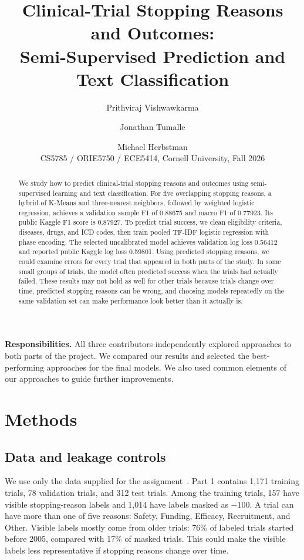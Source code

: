 \documentclass[10pt,twocolumn,letterpaper]{article}
\title{Clinical-Trial Stopping Reasons and Outcomes:\\Semi-Supervised Prediction and Text Classification}
\author{Prithviraj Vishwawkarma \and Jonathan Tumalle \and Michael Herbstman\\
CS5785 / ORIE5750 / ECE5414, Cornell University, Fall 2026}
\begin{document}
\maketitle
\noindent\textbf{Responsibilities.} All three contributors independently explored approaches
to both parts of the project. We compared our results and selected the best-performing
approaches for the final models. We also used common elements of our approaches to
guide further improvements.

\begin{abstract}
We study how to predict clinical-trial stopping reasons and outcomes using
semi-supervised learning and text classification. For five overlapping
stopping reasons, a hybrid of K-Means and three-nearest neighbors, followed by
weighted logistic regression, achieves a validation sample F1 of 0.88675 and
macro F1 of 0.77923. Its public Kaggle F1 score is 0.87927. To predict
trial success, we clean eligibility criteria, diseases, drugs, and ICD codes,
then train pooled TF-IDF logistic regression with phase encoding. The selected
uncalibrated model achieves validation log loss 0.56412 and reported public
Kaggle log loss 0.59801. Using predicted stopping
reasons, we could examine errors for every trial that appeared in both parts of the
study. In some small groups of trials, the model often predicted success when the
trials had actually failed. These results may not hold as well for other trials
because trials change over time, predicted stopping reasons can be wrong, and
choosing models repeatedly on the same validation set can make performance look
better than it actually is.
\end{abstract}

\section{Methods}
\subsection{Data and leakage controls}
We use only the data supplied for the assignment~\cite{assignment}. Part 1
contains 1,171 training trials, 78 validation trials, and 312 test trials. Among
the training trials, 157 have visible stopping-reason labels and 1,014 have
labels masked as $-100$. A trial can have more than one of five reasons:
Safety, Funding, Efficacy, Recruitment, and Other. Visible labels mostly come
from older trials: 76\% of labeled trials started before 2005, compared with
17\% of masked trials. This could make the visible labels less representative
if stopping reasons change over time.
\end{document}
